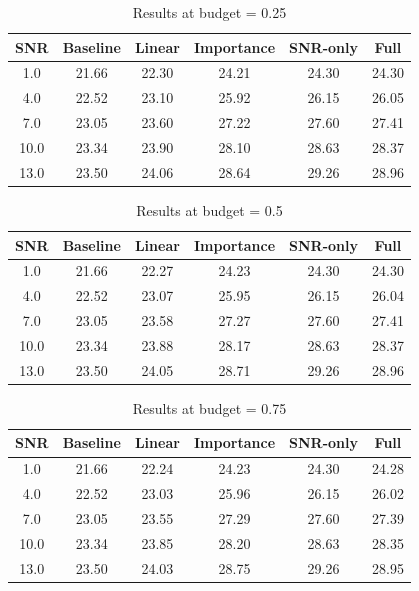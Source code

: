 \begin{table}[h]
\centering
\caption{Results at budget = 0.25}
\begin{tabular}{c|ccccc}
\hline
SNR & Baseline & Linear & Importance & SNR-only & Full \\
\hline
1.0 & 21.66 & 22.30 & 24.21 & 24.30 & 24.30 \\
4.0 & 22.52 & 23.10 & 25.92 & 26.15 & 26.05 \\
7.0 & 23.05 & 23.60 & 27.22 & 27.60 & 27.41 \\
10.0 & 23.34 & 23.90 & 28.10 & 28.63 & 28.37 \\
13.0 & 23.50 & 24.06 & 28.64 & 29.26 & 28.96 \\
\hline
\end{tabular}
\end{table}

\begin{table}[h]
\centering
\caption{Results at budget = 0.5}
\begin{tabular}{c|ccccc}
\hline
SNR & Baseline & Linear & Importance & SNR-only & Full \\
\hline
1.0 & 21.66 & 22.27 & 24.23 & 24.30 & 24.30 \\
4.0 & 22.52 & 23.07 & 25.95 & 26.15 & 26.04 \\
7.0 & 23.05 & 23.58 & 27.27 & 27.60 & 27.41 \\
10.0 & 23.34 & 23.88 & 28.17 & 28.63 & 28.37 \\
13.0 & 23.50 & 24.05 & 28.71 & 29.26 & 28.96 \\
\hline
\end{tabular}
\end{table}

\begin{table}[h]
\centering
\caption{Results at budget = 0.75}
\begin{tabular}{c|ccccc}
\hline
SNR & Baseline & Linear & Importance & SNR-only & Full \\
\hline
1.0 & 21.66 & 22.24 & 24.23 & 24.30 & 24.28 \\
4.0 & 22.52 & 23.03 & 25.96 & 26.15 & 26.02 \\
7.0 & 23.05 & 23.55 & 27.29 & 27.60 & 27.39 \\
10.0 & 23.34 & 23.85 & 28.20 & 28.63 & 28.35 \\
13.0 & 23.50 & 24.03 & 28.75 & 29.26 & 28.95 \\
\hline
\end{tabular}
\end{table}

